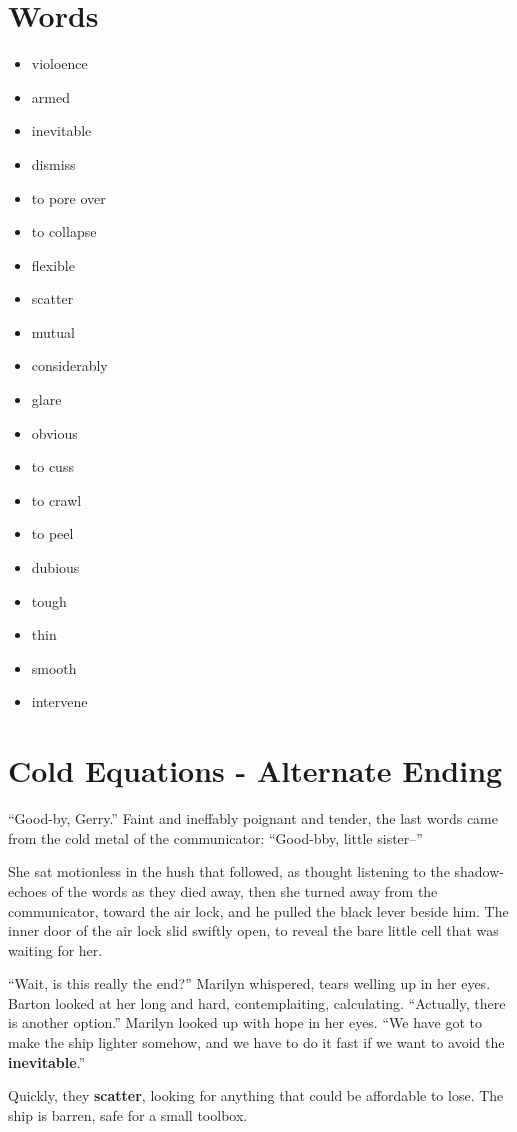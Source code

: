 \section{Words}

\begin{itemize}
    \item violoence
    \item armed
    \item inevitable   %
    \item dismiss
    \item to pore over %
    \item to collapse
    \item flexible
    \item scatter      %
    \item mutual
    \item considerably
    \item glare
    \item obvious
    \item to cuss
    \item to crawl
    \item to peel
    \item dubious
    \item tough
    \item thin
    \item smooth
    \item intervene
\end{itemize}


\section{Cold Equations - Alternate Ending}

``Good-by, Gerry.''
Faint and ineffably poignant and tender, the last words came from the cold metal
of the communicator:
``Good-bby, little sister--''

She sat motionless in the hush  that  followed,  as  thought  listening  to  the
shadow-echoes of the  words  as  they  died  away, then she turned away from the
communicator, toward the air lock, and he pulled the black lever beside him. The
inner  door of the air lock slid swiftly open, to reveal the  bare  little  cell
that was waiting for her.

``Wait, is this  really  the  end?''  Marilyn whispered, tears welling up in her
eyes.  Barton  looked  at  her  long  and  hard, contemplaiting, calculating.
``Actually, there is  another option.'' Marilyn looked up with hope in her eyes.
``We have got to make the ship lighter somehow, and we have  to do it fast if we
want to avoid the \textbf{inevitable}.''

Quickly, they \textbf{scatter}, looking for anything that could be affordable to
lose. The ship is barren, safe for a small toolbox. 

